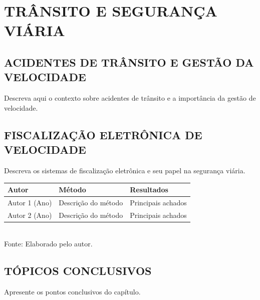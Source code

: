 \chapter{TRÂNSITO E SEGURANÇA VIÁRIA} \label{capitulo1}

\section{ACIDENTES DE TRÂNSITO E GESTÃO DA VELOCIDADE}

Descreva aqui o contexto sobre acidentes de trânsito e a importância da gestão de velocidade.

\section{FISCALIZAÇÃO ELETRÔNICA DE VELOCIDADE}

Descreva os sistemas de fiscalização eletrônica e seu papel na segurança viária.

\begin{quadro}[htbp]
\caption{Principais estudos sobre efeitos da fiscalização de velocidade na segurança viária, no âmbito internacional}
\label{quad:estudos_internacionais}
\centering
\small
\begin{tabular}{|p{4cm}|p{5cm}|p{4cm}|}
\hline
\textbf{Autor} & \textbf{Método} & \textbf{Resultados} \\
\hline
Autor 1 (Ano) & Descrição do método & Principais achados \\
\hline
Autor 2 (Ano) & Descrição do método & Principais achados \\
\hline
\end{tabular}
\\[0.2cm]
{\small Fonte: Elaborado pelo autor.}
\end{quadro}

\section{TÓPICOS CONCLUSIVOS}

Apresente os pontos conclusivos do capítulo.
